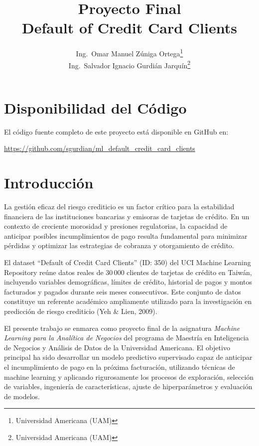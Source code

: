 \documentclass[journal]{apa7}
\title{Proyecto Final \\ Default of Credit Card Clients}
\author{%
  Ing.\ Omar Manuel Zúniga Ortega\thanks{Universidad Americana (UAM)} \\
  Ing.\ Salvador Ignacio Gurdián Jarquín\thanks{Universidad Americana (UAM)}%
}
\affiliation{Universidad Americana (UAM), Managua, Nicaragua}
\begin{document}
\maketitle

\section*{Disponibilidad del Código}
El código fuente completo de este proyecto está disponible en GitHub en:

\begin{center}
  \begin{minipage}{0.9\linewidth}
    \raggedright
    \url{https://github.com/sgurdian/ml_default_credit_card_clients}
  \end{minipage}
\end{center}

\section{Introducción}

La gestión eficaz del riesgo crediticio es un factor crítico para la estabilidad financiera de las instituciones bancarias y emisoras de tarjetas de crédito. En un contexto de creciente morosidad y presiones regulatorias, la capacidad de anticipar posibles incumplimientos de pago resulta fundamental para minimizar pérdidas y optimizar las estrategias de cobranza y otorgamiento de crédito.

El dataset \enquote{Default of Credit Card Clients} (ID: 350) del UCI Machine Learning Repository reúne datos reales de 30\,000 clientes de tarjetas de crédito en Taiwán, incluyendo variables demográficas, límites de crédito, historial de pagos y montos facturados y pagados durante seis meses consecutivos. Este conjunto de datos constituye un referente académico ampliamente utilizado para la investigación en predicción de riesgo crediticio (Yeh \& Lien, 2009).

El presente trabajo se enmarca como proyecto final de la asignatura \textit{Machine Learning para la Analítica de Negocios} del programa de Maestría en Inteligencia de Negocios y Análisis de Datos de la Universidad Americana. El objetivo principal ha sido desarrollar un modelo predictivo supervisado capaz de anticipar el incumplimiento de pago en la próxima facturación, utilizando técnicas de machine learning y aplicando rigurosamente los procesos de exploración, selección de variables, ingeniería de características, ajuste de hiperparámetros y evaluación de modelos.
\end{document}
